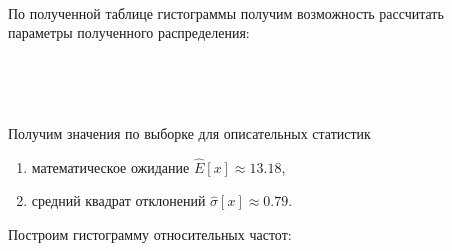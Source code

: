 \documentclass[
  14,
]{article}
\newenvironment{Shaded}{\begin{snugshade}}{\end{snugshade}}
\newcommand{\AttributeTok}[1]{\textcolor[rgb]{0.77,0.63,0.00}{#1}}
\newcommand{\DecValTok}[1]{\textcolor[rgb]{0.00,0.00,0.81}{#1}}
\newcommand{\FloatTok}[1]{\textcolor[rgb]{0.00,0.00,0.81}{#1}}
\newcommand{\FunctionTok}[1]{\textcolor[rgb]{0.00,0.00,0.00}{#1}}
\newcommand{\NormalTok}[1]{#1}
\newcommand{\OtherTok}[1]{\textcolor[rgb]{0.56,0.35,0.01}{#1}}
\newcommand{\SpecialCharTok}[1]{\textcolor[rgb]{0.00,0.00,0.00}{#1}}
\newcommand{\StringTok}[1]{\textcolor[rgb]{0.31,0.60,0.02}{#1}}
\providecommand{\tightlist}{%
  \setlength{\itemsep}{0pt}\setlength{\parskip}{0pt}}
\begin{document}
\(\ \)

По полученной таблице гистограммы получим возможность рассчитать
параметры полученного распределения:

\(\ \)

\begin{Shaded}
\end{Shaded}

\(\ \)

Получим значения по выборке для описательных статистик

\begin{enumerate}
\def\labelenumi{\arabic{enumi}.}
\tightlist
\item
  математическое ожидание \(\hat{E}[x] \approx 13.18\),
\item
  средний квадрат отклонений \(\hat{\sigma}[x] \approx 0.79\).
\end{enumerate}

Построим гистограмму относительных частот:

\(\ \)

\begin{Shaded}
\end{Shaded}
\end{document}
